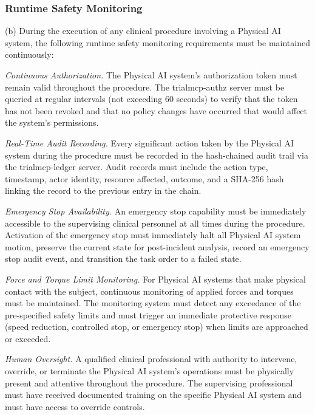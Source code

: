 \subsubsection{Runtime Safety Monitoring}

(b) During the execution of any clinical procedure involving a Physical AI system, the following runtime safety monitoring requirements must be maintained continuously:

\begin{description}[leftmargin=1.0cm,style=sameline]
\item[(1)] \textit{Continuous Authorization.} The Physical AI system's authorization token must remain valid throughout the procedure. The trialmcp-authz server must be queried at regular intervals (not exceeding 60 seconds) to verify that the token has not been revoked and that no policy changes have occurred that would affect the system's permissions.
\item[(2)] \textit{Real-Time Audit Recording.} Every significant action taken by the Physical AI system during the procedure must be recorded in the hash-chained audit trail via the trialmcp-ledger server. Audit records must include the action type, timestamp, actor identity, resource affected, outcome, and a SHA-256 hash linking the record to the previous entry in the chain.
\item[(3)] \textit{Emergency Stop Availability.} An emergency stop capability must be immediately accessible to the supervising clinical personnel at all times during the procedure. Activation of the emergency stop must immediately halt all Physical AI system motion, preserve the current state for post-incident analysis, record an emergency stop audit event, and transition the task order to a failed state.
\item[(4)] \textit{Force and Torque Limit Monitoring.} For Physical AI systems that make physical contact with the subject, continuous monitoring of applied forces and torques must be maintained. The monitoring system must detect any exceedance of the pre-specified safety limits and must trigger an immediate protective response (speed reduction, controlled stop, or emergency stop) when limits are approached or exceeded.
\item[(5)] \textit{Human Oversight.} A qualified clinical professional with authority to intervene, override, or terminate the Physical AI system's operations must be physically present and attentive throughout the procedure. The supervising professional must have received documented training on the specific Physical AI system and must have access to override controls.
\end{description}


